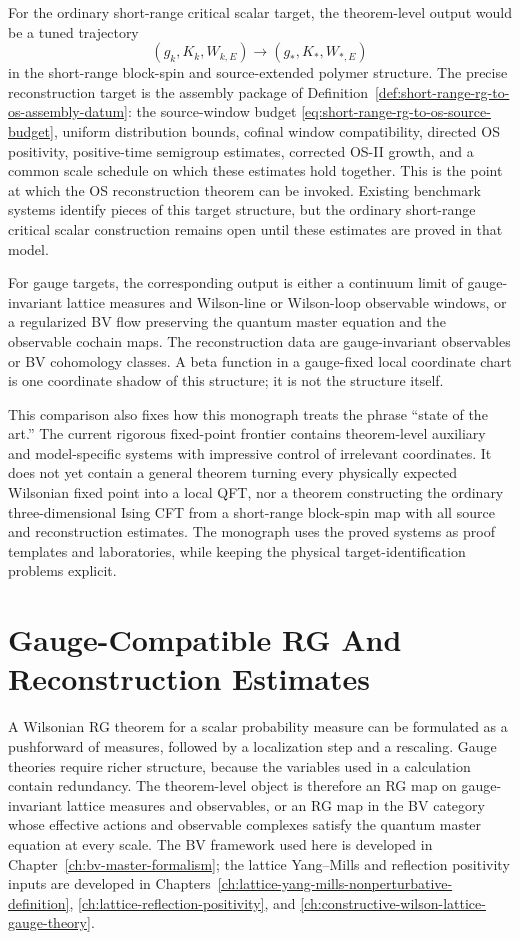 For the ordinary short-range critical scalar target, the theorem-level output
would be a tuned trajectory
\[
  (g_k,K_k,W_{k,E})\longrightarrow(g_\ast,K_\ast,W_{\ast,E})
\]
in the short-range block-spin and source-extended polymer structure.  The
precise reconstruction target is the assembly package of
Definition~\ref{def:short-range-rg-to-os-assembly-datum}: the source-window
budget \eqref{eq:short-range-rg-to-os-source-budget}, uniform distribution
bounds, cofinal window compatibility, directed OS positivity, positive-time
semigroup estimates, corrected OS-II growth, and a common scale schedule on
which these estimates hold together.  This is the point at which the OS
reconstruction theorem can be invoked.  Existing benchmark systems identify
pieces of this target structure, but the ordinary short-range critical scalar
construction remains open until these estimates are proved in that model.

For gauge targets, the corresponding output is either a continuum limit of
gauge-invariant lattice measures and Wilson-line or Wilson-loop observable
windows, or a regularized BV flow preserving the quantum master equation and
the observable cochain maps.  The reconstruction data are gauge-invariant
observables or BV cohomology classes.  A beta function in a gauge-fixed local
coordinate chart is one coordinate shadow of this structure; it is not the
structure itself.

This comparison also fixes how this monograph treats the phrase ``state of the
art.''  The current rigorous fixed-point frontier contains theorem-level
auxiliary and model-specific systems with impressive control of irrelevant
coordinates.  It does not yet contain a general theorem turning every
physically expected Wilsonian fixed point into a local QFT, nor a theorem
constructing the ordinary three-dimensional Ising CFT from a short-range
block-spin map with all source and reconstruction estimates.  The monograph uses
the proved systems as proof templates and laboratories, while keeping the
physical target-identification problems explicit.

\section{Gauge-Compatible RG And Reconstruction Estimates}

A Wilsonian RG theorem for a scalar probability measure can be formulated as
a pushforward of measures, followed by a localization step and a rescaling.
Gauge theories require richer structure, because the variables used in a
calculation contain redundancy.  The theorem-level object is therefore an RG
map on gauge-invariant lattice measures and observables, or an RG map in the BV category whose
effective actions and observable complexes satisfy the quantum master
equation at every scale.  The BV framework used here is developed in
Chapter~\ref{ch:bv-master-formalism}; the lattice Yang--Mills and reflection
positivity inputs are developed in
Chapters~\ref{ch:lattice-yang-mills-nonperturbative-definition},
\ref{ch:lattice-reflection-positivity}, and
\ref{ch:constructive-wilson-lattice-gauge-theory}.

